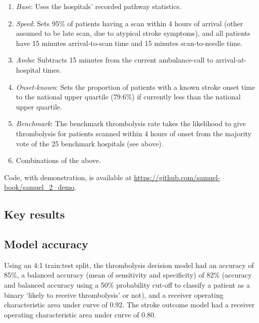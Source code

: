 \begin{enumerate}

    \item \textit{Base}: Uses the hospitals’ recorded pathway statistics.

    \item \textit{Speed}: Sets 95\% of patients having a scan within 4 hours of arrival (other assumed to be late scan, due to atypical stroke symptoms), and all patients have 15 minutes arrival-to-scan time and 15 minutes scan-to-needle time.

    \item \textit{Ambo}: Subtracts 15 minutes from the current ambulance-call to arrival-at-hospital times.

    \item  \textit{Onset-known}: Sets the proportion of patients with a known stroke onset time to the national upper quartile (79.6\%) if currently less than the national upper quartile.

    \item \textit{Benchmark}: The benchmark thrombolysis rate takes the likelihood to give thrombolysis for patients scanned within 4 hours of onset from the majority vote of the 25 benchmark hospitals (see above).

    \item Combinations of the above.

\end{enumerate}

Code, with demonstration, is available at \url{https://github.com/samuel-book/samuel_2_demo}.


\subsection{Key results}

\subsection{Model accuracy}

Using an 4:1 train:test split, the thrombolysis decision model had an accuracy of 85\%, a balanced accuracy (mean of sensitivity and specificity) of 82\% (accuracy and balanced accuracy using a 50\% probability cut-off to classify a patient as a binary `likely to receive thrombolysis' or not), and a receiver operating characteristic area under curve of 0.92. The stroke outcome model had a receiver operating characteristic area under curve of 0.80.

